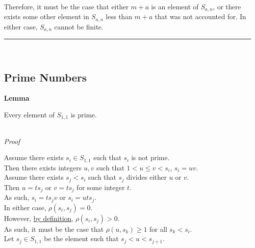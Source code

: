 \documentclass[a4paper,12pt]{article}
\begin{document}
\noindent Therefore, it must be the case that either $m + a$ is an element of $S_{a,n}$, or there exists some other element in $S_{a,n}$ less than $m + a$ that was not accounted for. In either case, $S_{a,n}$ cannot be finite.


\begin{center}
\noindent\rule{8cm}{0.4pt}
\end{center}
\noindent \\






\subsection{Prime Numbers}

\label{lemma:asn_subset_prime}
\hypertarget{lemma:asn_subset_prime}{}
\begin{tcolorbox}
\textbf{Lemma}

Every element of $S_{1, 1}$ is prime. 
\end{tcolorbox}

\noindent \\
\textit{Proof}

\noindent Assume there exists $s_i \in S_{1, 1}$ such that $s_i$ is not prime.\\

\noindent Then there exists integers $u, v$ such that $1 < u \leq v < s_i$, $s_i = uv$.\\

\noindent Assume there exists $s_j < s_i$ such that $s_j$ divides either $u$ or $v$.\\

\noindent Then $u = ts_j$ or $v = ts_j$ for some integer $t$.\\

\noindent As such, $s_i = ts_jv$ or $s_i = uts_j$.\\

\noindent In either case, $\rho(s_i, s_j) = 0$.\\

\noindent However, \hyperlink{definition:awkward_number_series}{by definition}, $\rho(s_i, s_j) > 0$.\\

\noindent As such, it must be the case that $\rho(u, s_k) \geq 1$ for all $s_k < s_i$.\\

\noindent Let $s_j \in S_{1, 1}$ be the element such that $s_j < u < s_{j + 1}$.\\
\end{document}
